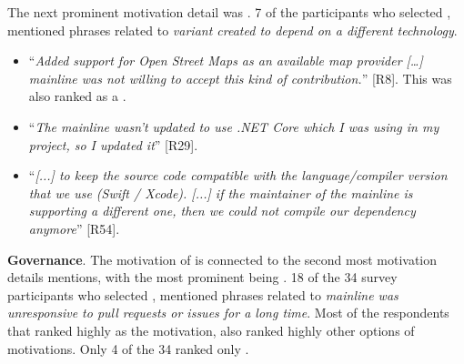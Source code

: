 \nd The next prominent  motivation detail was .
7 of the participants who selected , mentioned phrases related to \emph{variant created to depend on a different technology}.

\begin{itemize}[leftmargin=*]
\item ``\emph{Added support for Open Street Maps as an available map provider [\ldots] mainline was not willing to accept this kind of contribution.}'' [R8]. This was also ranked as a . 
\item ``\emph{The mainline wasn't updated to use .NET Core which I was using in my project, so I updated it}'' [R29].
\item ``\emph{[...] to keep the source code compatible with the language/compiler version that we use (Swift / Xcode). [...] %
if the maintainer of the mainline is supporting a different one, then we could not compile our dependency anymore}'' [R54].
\end{itemize}

\nd \textbf{Governance}. The motivation of  is connected to the second most motivation details mentions, with the most prominent being . 18 of the 34 survey participants who selected , mentioned phrases related to \emph{mainline was unresponsive to pull requests or issues for a long time}. Most of the respondents that ranked highly  as the motivation, also ranked highly other options of motivations. Only 4 of the 34 ranked only .


